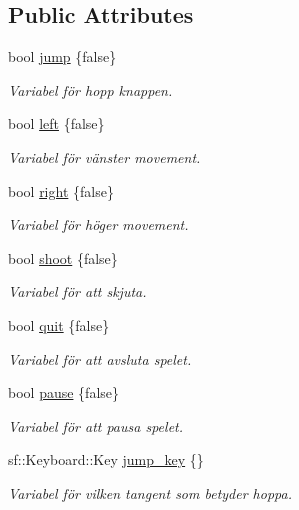 \subsection*{Public Attributes}
\begin{DoxyCompactItemize}
\item 
bool \hyperlink{classKey__Handling_af7bf77c8b1d7ed6ea3282f45f76fcf61}{jump} \{false\}
\begin{DoxyCompactList}\small\item\em Variabel för hopp knappen. \end{DoxyCompactList}\item 
bool \hyperlink{classKey__Handling_ab72108363edad52be4d7c4d8a572f6ec}{left} \{false\}
\begin{DoxyCompactList}\small\item\em Variabel för vänster movement. \end{DoxyCompactList}\item 
bool \hyperlink{classKey__Handling_a494ba1ae43c55d5202f24e9bc78c5ed1}{right} \{false\}
\begin{DoxyCompactList}\small\item\em Variabel för höger movement. \end{DoxyCompactList}\item 
bool \hyperlink{classKey__Handling_ae9d219c1a9387620c14120d9a45d5db1}{shoot} \{false\}
\begin{DoxyCompactList}\small\item\em Variabel för att skjuta. \end{DoxyCompactList}\item 
bool \hyperlink{classKey__Handling_a73a615e629c4d3db0bbecb6fd35fe31b}{quit} \{false\}
\begin{DoxyCompactList}\small\item\em Variabel för att avsluta spelet. \end{DoxyCompactList}\item 
bool \hyperlink{classKey__Handling_ae297ccc0a53483abe41f2788ec7863d8}{pause} \{false\}
\begin{DoxyCompactList}\small\item\em Variabel för att pausa spelet. \end{DoxyCompactList}\item 
sf\+::\+Keyboard\+::\+Key \hyperlink{classKey__Handling_a6d7d9bb4dc72122fc257d0a98b8613d5}{jump\+\_\+key} \{\}
\begin{DoxyCompactList}\small\item\em Variabel för vilken tangent som betyder hoppa. \end{DoxyCompactList}\item 

\end{DoxyCompactItemize}
